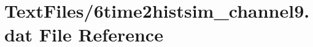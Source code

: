 \hypertarget{6time2histsim__channel9_8dat}{}\section{Text\+Files/6time2histsim\+\_\+channel9.dat File Reference}
\label{6time2histsim__channel9_8dat}
